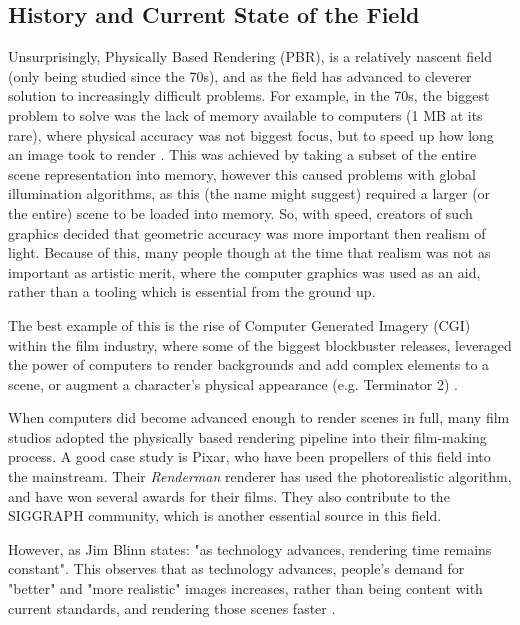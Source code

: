 \documentclass[../main.tex]{subfiles}
\begin{document}
\subsection{History and Current State of the Field}
Unsurprisingly, Physically Based Rendering (PBR), is a relatively nascent field (only being studied since the 70s), and as the field has advanced to cleverer solution to increasingly difficult problems. 
For example, in the 70s, the biggest problem to solve was the lack of memory available to computers (1 MB at its rare), where physical accuracy was not biggest focus, but to speed up how long an image took to render \cite{pharrPhysicallyBasedRendering2016}. This was achieved by taking a subset of the entire scene representation into memory, however this caused problems with global illumination algorithms, as this (the name might suggest) required a larger (or the entire) scene to be loaded into memory. So, with speed, creators of such graphics decided that geometric accuracy was more important then realism of light. Because of this, many people though at the time that realism was not as important as artistic merit, where the computer graphics was used as an aid, rather than a tooling which is essential from the ground up. 

The best example of this is the rise of Computer Generated Imagery (CGI) within the film industry, where some of the biggest blockbuster releases, leveraged the power of computers to render backgrounds and add complex elements to a scene, or augment a character's physical appearance (e.g. Terminator 2) \cite{bramescoTerminator30Groundbreaking2021}.

When computers did become advanced enough to render scenes in full, many film studios adopted the physically based rendering pipeline into their film-making process. A good case study is Pixar, who have been propellers of this field into the mainstream. Their \textit{Renderman} renderer has used the photorealistic algorithm, and have won several awards for their films. They also contribute to the SIGGRAPH community, which is another essential source in this field.

However, as Jim Blinn states: "as technology advances, rendering time remains constant". This observes that as technology advances, people's demand for "better" and "more realistic" images increases, rather than being content with current standards, and rendering those scenes faster \cite{pharrPhysicallyBasedRendering2016}.
\end{document}
